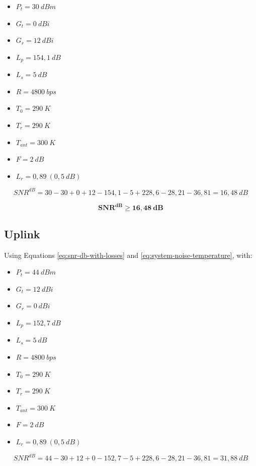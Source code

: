 \begin{itemize}
    \item $P_{t} = 30\ dBm$
    \item $G_{t} = 0\ dBi$
    \item $G_{r} = 12\ dBi$
    \item $L_{p} = 154,1\ dB$
    \item $L_{s} = 5\ dB$
    \item $R = 4800\ bps$
    \item $T_{0} = 290\ K$
    \item $T_{r} = 290\ K$
    \item $T_{ant} = 300\ K$
    \item $F = 2\ dB$
    \item $L_{r} = 0,89\ (0,5\ dB)$
\end{itemize}

\begin{equation}
    SNR^{dB} = 30 - 30 + 0 + 12 - 154,1 - 5 + 228,6 - 28,21 - 36,81 = 16,48\ dB
\end{equation}

\begin{equation}
\mathbf{SNR^{dB} \geq 16,48\ dB}
\end{equation}

\subsection{Uplink}

Using Equations \ref{eq:snr-db-with-losses} and \ref{eq:system-noise-temperature}, with:

\begin{itemize}
    \item $P_{t} = 44\ dBm$
    \item $G_{t} = 12\ dBi$
    \item $G_{r} = 0\ dBi$
    \item $L_{p} = 152,7\ dB$
    \item $L_{s} = 5\ dB$
    \item $R = 4800\ bps$
    \item $T_{0} = 290\ K$
    \item $T_{r} = 290\ K$
    \item $T_{ant} = 300\ K$
    \item $F = 2\ dB$
    \item $L_{r} = 0,89\ (0,5\ dB)$
\end{itemize}

\begin{equation}
    SNR^{dB} = 44 - 30 + 12 + 0 - 152,7 - 5 + 228,6 - 28,21 - 36,81 = 31,88\ dB
\end{equation}

